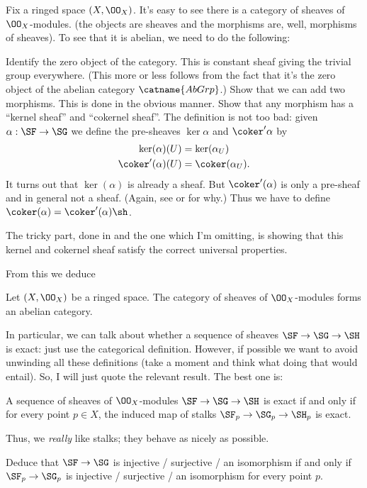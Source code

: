 Fix a ringed space $(X, \OO_X)$.
It's easy to see there is a category of sheaves of $\OO_X$-modules.
(the objects are sheaves and the morphisms are, well, morphisms of sheaves).
To see that it is abelian, we need to do the following:
\begin{itemize}
	\ii Identify the zero object of the category.
	This is constant sheaf giving the trivial group everywhere.
	(This more or less follows from the fact that it's 
	the zero object of the abelian category $\catname{AbGrp}$.)
	\ii Show that we can add two morphisms.
	This is done in the obvious manner.
	\ii Show that any morphism has a ``kernel sheaf'' and ``cokernel sheaf''.
	The definition is not too bad: given $\alpha : \SF \to \SG$ we define the
	pre-sheaves $\ker\alpha$ and $\coker'\alpha$ by
	\begin{align*}
		\ker(\alpha)(U) &= \ker(\alpha_U) \\
		\coker'(\alpha)(U) &= \coker(\alpha_U).
	\end{align*}
	It turns out that $\ker(\alpha)$ is already a sheaf.
	But $\coker'(\alpha)$ is only a pre-sheaf and in general not a sheaf.
	(Again, see \cite{ref:vakil} or \cite{ref:gathmann} for why.)
	Thus we have to define $\coker(\alpha) = \coker'(\alpha) \sh$.
	
	The tricky part, done in \cite{ref:vakil} and the one which I'm omitting,
	is showing that this kernel and cokernel sheaf satisfy
	the correct universal properties.
\end{itemize}

From this we deduce
\begin{theorem}
	Let $(X, \OO_X)$ be a ringed space.
	The category of sheaves of $\OO_X$-modules forms an abelian category.
\end{theorem}

In particular, we can talk about whether a sequence of sheaves
$\SF \to \SG \to \SH$ is exact: just use the categorical definition.
However, if possible we want to avoid unwinding all these definitions
(take a moment and think what doing that would entail).
So, I will just quote the relevant result.
The best one is:
\begin{theorem}
	A sequence of sheaves of $\OO_X$-modules
	$\SF \to \SG \to \SH$ is exact if and only if
	for every point $p \in X$,
	the induced map of stalks $\SF_p \to \SG_p \to \SH_p$ is exact.
\end{theorem}


Thus, we \emph{really} like stalks; they behave as nicely as possible.
\begin{ques}
	Deduce that $\SF \to \SG$ is injective / surjective / an isomorphism
	if and only if $\SF_p \to \SG_p$ is injective / surjective / an isomorphism
	for every point $p$.
\end{ques}

